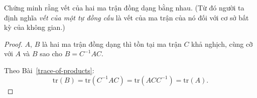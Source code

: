 \documentclass[class=linearalgebra,crop=false]{standalone}
\begin{document}
\begin{exercise}
    Chứng minh rằng vết của hai ma trận đồng dạng bằng nhau. (Từ đó người ta định nghĩa \textit{vết của một tự đồng cấu} là vết của ma trận của nó đối với cơ sở bất kỳ của không gian.)
\end{exercise}

\begin{proof}
    $A$, $B$ là hai ma trận đồng dạng thì tồn tại ma trận $C$ khả nghịch, cùng cỡ với $A$ và $B$ sao cho $B = C^{-1}AC$.
    \par Theo Bài~\ref{trace-of-products}:
    \[
        \text{tr}(B) = \text{tr}(C^{-1}AC) = \text{tr}(ACC^{-1}) = \text{tr}(A).
    \]
\end{proof}
\end{document}
